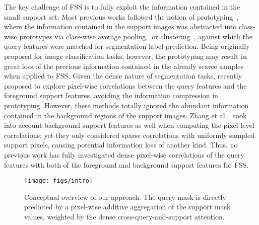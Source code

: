 \documentclass[runningheads,table,xcdraw]{llncs}
\begin{document}
The key challenge of FSS is to fully exploit the information contained in the small support set.
Most previous works followed the notion of prototyping~\cite{snell2017prototypical},
where the information contained in the support images was abstracted into class-wise prototypes via class-wise average pooling~\cite{wang2019panet,zhang2019canet,zhang2020sg} or clustering~\cite{liu2020part,yang2020prototype}, against which the query features were matched for segmentation label prediction.
Being originally proposed for image classification tasks, however, the prototyping may result in great loss of the precious information contained in the already scarce samples when applied to FSS.
Given the dense nature of segmentation tasks, \cite{min2021hypercorrelation,wang2020few,zhang2019pyramid} recently proposed to explore pixel-wise correlations between the query features and the foreground support features, avoiding the information compression in prototyping.
However, these methods totally ignored the abundant information contained in the background regions of the support images.
Zhang et al.~\cite{zhang2021few} took into account background support features as well when computing the pixel-level correlations;
yet they only considered sparse correlations with uniformly sampled support pixels, causing potential information loss of another kind.
Thus, no previous work has fully investigated dense pixel-wise correlations of the query features with both of the foreground and background support features for FSS.

\begin{figure}[t]
  \centering
   \texttt{[image: figs/intro]}
   \caption{Conceptual overview of our approach.
   The query mask is directly predicted by a pixel-wise additive aggregation of the support mask values, weighted by the dense cross-query-and-support attention.}
\label{fig:intro}
\end{figure}
\end{document}
